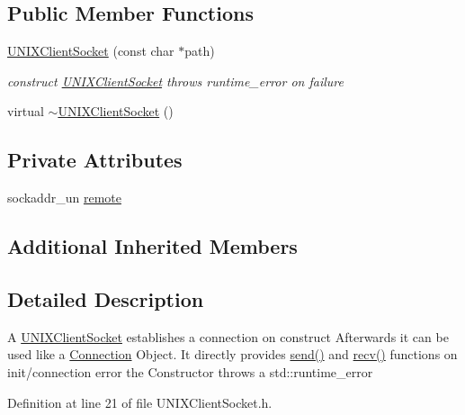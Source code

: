 \subsection*{Public Member Functions}
\begin{DoxyCompactItemize}
\item 
\hyperlink{classUNIXClientSocket_a1c1fd48cd60ea3ee5478ae6b238ab376}{U\+N\+I\+X\+Client\+Socket} (const char $\ast$path)
\begin{DoxyCompactList}\small\item\em construct \hyperlink{classUNIXClientSocket}{U\+N\+I\+X\+Client\+Socket} throws runtime\+\_\+error on failure \end{DoxyCompactList}\item 
virtual \hyperlink{classUNIXClientSocket_ade64c842f5dba7948419ebdcbec291d6}{$\sim$\+U\+N\+I\+X\+Client\+Socket} ()
\end{DoxyCompactItemize}
\subsection*{Private Attributes}
\begin{DoxyCompactItemize}
\item 
sockaddr\+\_\+un \hyperlink{classUNIXClientSocket_a78c19c12f8befc559e916b41262d5f6e}{remote}
\end{DoxyCompactItemize}
\subsection*{Additional Inherited Members}


\subsection{Detailed Description}
A \hyperlink{classUNIXClientSocket}{U\+N\+I\+X\+Client\+Socket} establishes a connection on construct Afterwards it can be used like a \hyperlink{classConnection}{Connection} Object. It directly provides \hyperlink{classConnection_a5466a66e569e81d891559686f2c7594b}{send()} and \hyperlink{classConnection_ab16b8a780c69303beec9b1f67fb596f3}{recv()} functions on init/connection error the Constructor throws a std\+::runtime\+\_\+error 

Definition at line 21 of file U\+N\+I\+X\+Client\+Socket.\+h.



